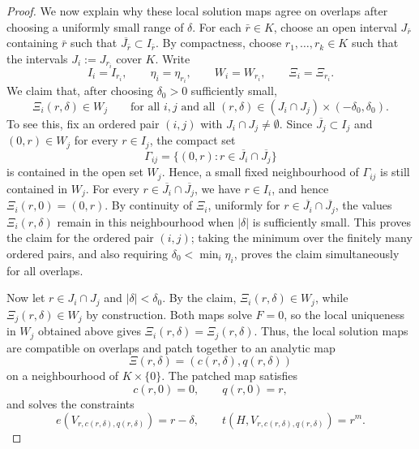 \begin{proof}
We now explain why these local solution maps agree on overlaps after choosing a
uniformly small range of $\delta$.  For each $\bar r\in K$, choose an open
interval $J_{\bar r}$ containing $\bar r$ such that
$\overline{J_{\bar r}}\subset I_{\bar r}$.
By compactness, choose $r_1,\ldots,r_k\in K$ such that the intervals
$J_i:=J_{r_i}$ cover $K$.  Write
\[
  I_i=I_{r_i},\qquad
  \eta_i=\eta_{r_i},\qquad
  W_i=W_{r_i},\qquad
  \Xi_i=\Xi_{r_i}.
\]
We claim that, after choosing $\delta_0>0$ sufficiently small,
\[
  \Xi_i(r,\delta)\in W_j
  \qquad
  \text{for all }i,j
  \text{ and all }(r,\delta)\in
  (J_i\cap J_j)\times(-\delta_0,\delta_0).
\]
To see this, fix an ordered pair $(i,j)$ with $J_i\cap J_j\ne\emptyset$.  Since
$\overline{J_j}\subset I_j$ and $(0,r)\in W_j$ for every $r\in I_j$, the
compact set
\[
  \Gamma_{ij}
  =
  \{(0,r):r\in \overline{J_i}\cap\overline{J_j}\}
\]
is contained in the open set $W_j$.  Hence, a small fixed neighbourhood of
$\Gamma_{ij}$ is still contained in $W_j$.  For every
$r\in\overline{J_i}\cap\overline{J_j}$, we have $r\in I_i$, and hence
$\Xi_i(r,0)=(0,r)$.  By continuity of $\Xi_i$, uniformly for
$r\in \overline{J_i}\cap\overline{J_j}$, the values $\Xi_i(r,\delta)$ remain
in this neighbourhood when $|\delta|$ is sufficiently small.  This proves the
claim for the ordered pair $(i,j)$; taking the minimum over the finitely many
ordered pairs, and also requiring $\delta_0<\min_i\eta_i$, proves the claim
simultaneously for all overlaps.

Now let $r\in J_i\cap J_j$ and $|\delta|<\delta_0$.  By the claim,
$\Xi_i(r,\delta)\in W_j$, while $\Xi_j(r,\delta)\in W_j$ by construction.
Both maps solve $F=0$, so the local uniqueness in $W_j$ obtained above gives
$\Xi_i(r,\delta)=\Xi_j(r,\delta)$.  Thus, the local solution
maps are compatible on overlaps and patch together to an analytic map
\[
  \Xi(r,\delta)=(c(r,\delta),q(r,\delta))
\]
on a neighbourhood of $K\times\{0\}$.  The patched map satisfies
\[
  c(r,0)=0,\qquad q(r,0)=r,
\]
and solves the constraints
\begin{equation}\label{eq:comparison-graphon-constraints}
  e(V_{r,c(r,\delta),q(r,\delta)})=r-\delta,
  \qquad
  t(H,V_{r,c(r,\delta),q(r,\delta)})=r^m.
\end{equation}


\end{proof}
